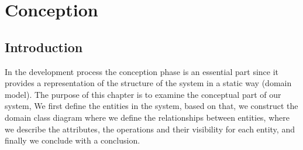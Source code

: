 \documentclass[]{uc2pfecaneva}
\begin{document}
    \setlength{\parskip}{6pt}
    \tableofcontents
    \setcounter{chapter}{1}
    \chapter{Conception}
    \newpage


    \raggedright\section{Introduction}
    In the development process the conception phase is an essential part since it provides a representation of the structure of the system in a static way (domain model).
    The purpose of this chapter is to examine the conceptual part of our system, We first define the entities in the system, based on that, we construct the domain class diagram where we define the relationships between entities, where we describe the attributes, the operations and their visibility for each entity, and finally we conclude with a conclusion.
\end{document}
